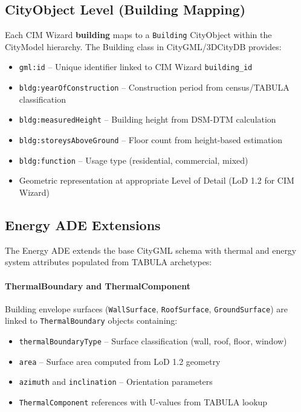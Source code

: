 \subsection{CityObject Level (Building Mapping)}

Each CIM Wizard \textbf{building} maps to a \texttt{Building} CityObject within the CityModel hierarchy. The Building class in CityGML/3DCityDB provides:
\begin{itemize}[leftmargin=1.2em]
    \item \texttt{gml:id} -- Unique identifier linked to CIM Wizard \texttt{building\_id}
    \item \texttt{bldg:yearOfConstruction} -- Construction period from census/TABULA classification
    \item \texttt{bldg:measuredHeight} -- Building height from DSM-DTM calculation
    \item \texttt{bldg:storeysAboveGround} -- Floor count from height-based estimation
    \item \texttt{bldg:function} -- Usage type (residential, commercial, mixed)
    \item Geometric representation at appropriate Level of Detail (LoD 1.2 for CIM Wizard)
\end{itemize}

\subsection{Energy ADE Extensions}

The Energy ADE extends the base CityGML schema with thermal and energy system attributes populated from TABULA archetypes:

\paragraph{ThermalBoundary and ThermalComponent}
Building envelope surfaces (\texttt{WallSurface}, \texttt{RoofSurface}, \texttt{GroundSurface}) are linked to \texttt{ThermalBoundary} objects containing:
\begin{itemize}[leftmargin=1.2em]
    \item \texttt{thermalBoundaryType} -- Surface classification (wall, roof, floor, window)
    \item \texttt{area} -- Surface area computed from LoD 1.2 geometry
    \item \texttt{azimuth} and \texttt{inclination} -- Orientation parameters
    \item \texttt{ThermalComponent} references with U-values from TABULA lookup
\end{itemize}

